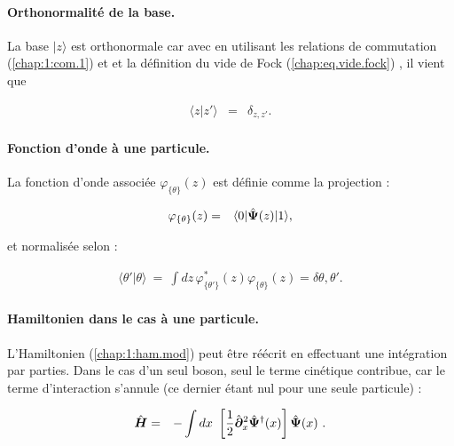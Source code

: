 \paragraph{Orthonormalité de la base.}

La base $\vert z \rangle$ est orthonormale car avec en utilisant les relations de commutation (\ref{chap:1:com.1}) et et la définition du vide de Fock (\ref{chap:eq.vide.fock}) , il vient que 

\begin{eqnarray}
	\langle z\vert z' \rangle  & = & \delta_{z,z'}.
\end{eqnarray}


\paragraph{Fonction d’onde à une particule.}

La fonction d’onde associée \(\varphi_{\{\theta \}}(z)\) est définie comme la projection :

\begin{eqnarray}
	\varphi_{\{\theta\}}(z) & = & \langle 0 \vert \hat{\bm{\Psi}}(z) \vert 1 \rangle,
\end{eqnarray}

et normalisée selon :

\begin{eqnarray}
	\langle \theta' \vert \theta \rangle ~=~ \int dz\,  \varphi_{\{\theta'\}}^\ast(z)\varphi_{\{\theta\}}(z) = \delta{\theta, \theta'}.
\end{eqnarray}

\paragraph{Hamiltonien dans le cas à une particule.}

L'Hamiltonien (\ref{chap:1:ham.mod}) peut être réécrit en effectuant une intégration par parties. Dans le cas d'un seul boson, seul le terme cinétique contribue, car le terme d'interaction s'annule (ce dernier étant nul pour une seule particule) :


\begin{eqnarray}
	\operator{H} & = & -\int dx  \left [\frac{1}{2}\operator{\partial}_x^2 \operator{\Psi}^\dag(x)\right ] \operator{\Psi}(x)  \label{chap:1:ham.mod.1.part.2}.
\end{eqnarray}



